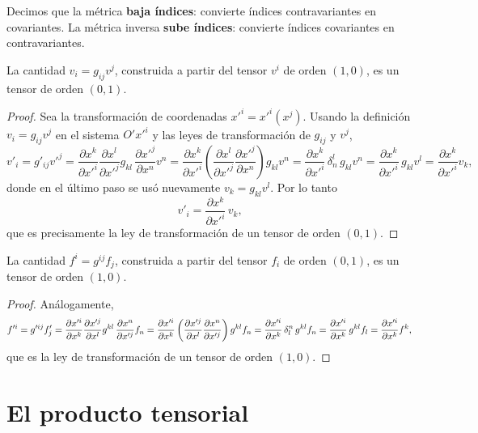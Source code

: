 \begin{observacion}
Decimos que la métrica \textbf{baja índices}: convierte índices
contravariantes en covariantes. La métrica inversa \textbf{sube
índices}: convierte índices covariantes en contravariantes.
\end{observacion}

\begin{proposicionc}
La cantidad $v_i = g_{ij}v^j$, construida a partir del tensor $v^i$ de
orden $(1,0)$, es un tensor de orden $(0,1)$.
\end{proposicionc}

\begin{proof}
Sea la transformación de coordenadas $x'^i=x'^i(x^j)$. Usando la
definición $v_i=g_{ij}v^j$ en el sistema $O'x'^i$ y las leyes de
transformación de $g_{ij}$ y $v^j$,
\[
v'_i = g'_{ij} v'^j = \frac{\partial x^k}{\partial x'^i}\frac{\partial
x^l}{\partial x'^j} g_{kl}\, \frac{\partial x'^j}{\partial x^n} v^n =
\frac{\partial x^k}{\partial x'^i}\left(\frac{\partial x^l}{\partial
x'^j}\frac{\partial x'^j}{\partial x^n}\right) g_{kl} v^n = \frac{\partial
x^k}{\partial x'^i}\, \delta^l_n\, g_{kl} v^n = \frac{\partial
x^k}{\partial x'^i}\, g_{kl} v^l = \frac{\partial x^k}{\partial x'^i}
v_k,
\]
donde en el último paso se usó nuevamente $v_k=g_{kl}v^l$. Por lo tanto
\[
v'_i = \frac{\partial x^k}{\partial x'^i}\, v_k ,
\]
que es precisamente la ley de transformación de un tensor de orden
$(0,1)$. \qedhere
\end{proof}

\begin{proposicionc}
La cantidad $f^i=g^{ij}f_j$, construida a partir del tensor $f_i$ de
orden $(0,1)$, es un tensor de orden $(1,0)$.
\end{proposicionc}

\begin{proof}
Análogamente,
\[
f'^i = g'^{ij}f'_j = \frac{\partial x'^i}{\partial x^k}\frac{\partial
x'^j}{\partial x^l} g^{kl}\, \frac{\partial x^n}{\partial x'^j} f_n =
\frac{\partial x'^i}{\partial x^k}\left(\frac{\partial x'^j}{\partial
x^l}\frac{\partial x^n}{\partial x'^j}\right) g^{kl} f_n = \frac{\partial
x'^i}{\partial x^k}\, \delta^n_l\, g^{kl} f_n = \frac{\partial
x'^i}{\partial x^k}\, g^{kl}f_l = \frac{\partial x'^i}{\partial x^k}
f^k , \qedhere
\]
que es la ley de transformación de un tensor de orden $(1,0)$.
\end{proof}

\section{El producto tensorial}

